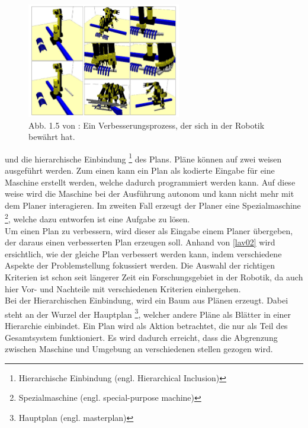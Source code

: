 \begin{figure} %
	\centering
	\includegraphics[width=0.6\textwidth]{images/hierarchical.png}
	\caption{Abb. 1.5 von \cite[~S. 20]{}:  Ein Verbesserungsprozess, der sich in der Robotik bewährt hat.}
	\label{hierarchical}
\end{figure}
 und die hierarchische Einbindung \footnote{Hierarchische Einbindung (engl. Hierarchical Inclusion)} des Plans.
Pläne können auf zwei weisen ausgeführt werden. Zum einen kann ein Plan als kodierte Eingabe für eine Maschine erstellt werden, welche dadurch programmiert werden kann. Auf diese weise wird die Maschine bei der Ausführung autonom und kann nicht mehr mit dem Planer interagieren. 
Im zweiten Fall erzeugt der Planer eine Spezialmaschine \footnote{Spezialmaschine (engl. special-purpose machine)}, welche dazu entworfen ist eine Aufgabe zu lösen.
\newline\\
Um einen Plan zu verbessern, wird dieser als Eingabe einem Planer übergeben, der daraus einen verbesserten Plan erzeugen soll. 
Anhand von \ref{lav02} wird ersichtlich, wie der gleiche Plan verbessert werden kann, indem verschiedene Aspekte der Problemstellung fokussiert werden.
Die Auswahl der richtigen Kriterien ist schon seit längerer Zeit ein Forschungsgebiet in der Robotik, da auch hier Vor- und Nachteile mit verschiedenen Kriterien einhergehen. %
\newline\\
Bei der Hierarchischen Einbindung, wird ein Baum aus Plänen erzeugt. Dabei steht an der Wurzel der Hauptplan \footnote{Hauptplan (engl. masterplan)}, welcher andere Pläne als Blätter in einer Hierarchie einbindet. Ein Plan wird als Aktion betrachtet, die nur als Teil des Gesamtsystem funktioniert. Es wird dadurch erreicht, dass die Abgrenzung zwischen Maschine und Umgebung an verschiedenen stellen gezogen wird.
\newline\cite[~S. 21ff]{Lav06} 



